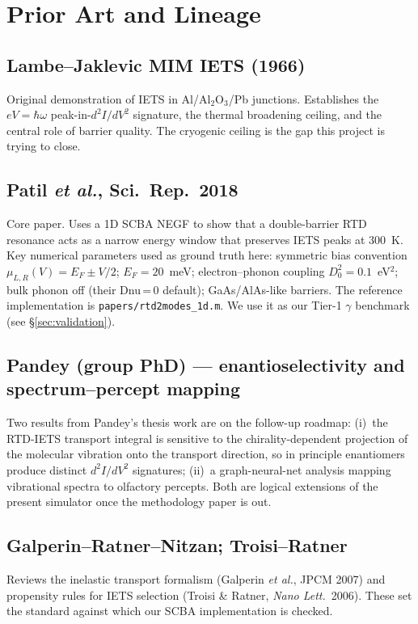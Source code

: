 \documentclass[11pt,a4paper,onecolumn]{article}
\newcommand{\code}[1]{\texttt{\small #1}}
\begin{document}
\section{Prior Art and Lineage}

\subsection{Lambe--Jaklevic MIM IETS (1966)}
Original demonstration of IETS in Al/Al$_2$O$_3$/Pb junctions. Establishes
the $eV = \hbar\omega$ peak-in-$d^2I/dV^2$ signature, the thermal broadening
ceiling, and the central role of barrier quality. The cryogenic ceiling is
the gap this project is trying to close.

\subsection{Patil \textit{et al.}, Sci.\ Rep.\ 2018}
Core paper. Uses a 1D SCBA NEGF to show that a double-barrier RTD
resonance acts as a narrow energy window that preserves IETS peaks at 300~K.
Key numerical parameters used as ground truth here:
symmetric bias convention $\mu_{L,R}(V) = E_F \pm V/2$; $E_F = 20$~meV;
electron--phonon coupling $D_0^2 = 0.1$~eV$^2$; bulk phonon off (their
Dnu\,=\,0 default); GaAs/AlAs-like barriers. The reference implementation is
\code{papers/rtd2modes\_1d.m}. We use it as our Tier-1 $\gamma$ benchmark
(see \S\ref{sec:validation}).

\subsection{Pandey (group PhD) --- enantioselectivity and spectrum--percept
mapping}
Two results from Pandey's thesis work are on the follow-up roadmap:
(i)~the RTD-IETS transport integral is sensitive to the chirality-dependent
projection of the molecular vibration onto the transport direction, so in
principle enantiomers produce distinct $d^2I/dV^2$ signatures;
(ii)~a graph-neural-net analysis mapping vibrational spectra to olfactory
percepts. Both are logical extensions of the present simulator once the
methodology paper is out.

\subsection{Galperin--Ratner--Nitzan; Troisi--Ratner}
Reviews the inelastic transport formalism (Galperin \textit{et al.}, JPCM
2007) and propensity rules for IETS selection (Troisi \& Ratner, \textit{Nano
Lett.}\ 2006). These set the standard against which our SCBA
implementation is checked.
\end{document}
